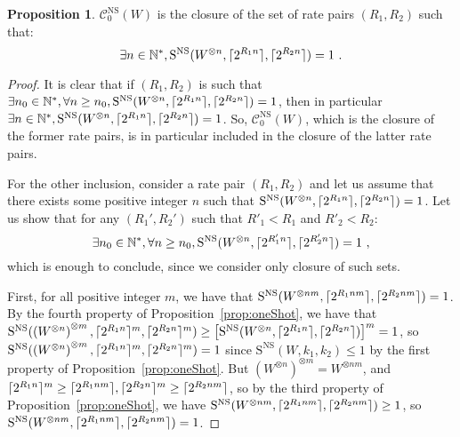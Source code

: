 \documentclass[11pt]{article}
\theoremstyle{definition}
\newtheorem{prop}[theo]{Proposition}
\theoremstyle{remark}
\DeclarePairedDelimiter\ceil{\lceil}{\rceil}
\begin{document}
\begin{prop}
  \label{prop:ZENScapacity}
   $\mathcal{C}^{\mathrm{NS}}_0(W)$ is the closure of the set of rate pairs $(R_1,R_2)$ such that:
  \[ \exists n \in \mathbb{N}^*, \mathrm{S}^{\mathrm{NS}}(W^{\otimes n},\ceil{2^{R_1n}},\ceil{2^{R_2n}}) = 1 \ . \]
\end{prop}
\begin{proof}
  It is clear that if $(R_1,R_2)$ is such that $\exists n_0 \in \mathbb{N}^*, \forall n \geq n_0, \mathrm{S}^{\mathrm{NS}}(W^{\otimes n},\ceil{2^{R_1n}},\ceil{2^{R_2n}}) = 1$, then in particular $\exists n \in \mathbb{N}^*, \mathrm{S}^{\mathrm{NS}}(W^{\otimes n},\ceil{2^{R_1n}},\ceil{2^{R_2n}}) = 1$. So, $\mathcal{C}^{\mathrm{NS}}_0(W)$, which is the closure of the former rate pairs, is in particular included in the closure of the latter rate pairs.
  
  For the other inclusion, consider a rate pair $(R_1,R_2)$ and let us assume that there exists some positive integer $n$ such that $\mathrm{S}^{\mathrm{NS}}(W^{\otimes n},\ceil{2^{R_1n}},\ceil{2^{R_2n}}) = 1$. Let us show that for any $(R_1',R_2')$ such that $R'_1 < R_1$ and $R'_2 < R_2$:
  \[ \exists n_0 \in \mathbb{N}^*, \forall n \geq n_0, \mathrm{S}^{\mathrm{NS}}(W^{\otimes n},\ceil{2^{R_1'n}},\ceil{2^{R_2'n}}) = 1 \ , \]
  which is enough to conclude, since we consider only closure of such sets.
  
  First, for all positive integer $m$, we have that $\mathrm{S}^{\mathrm{NS}}(W^{\otimes nm},\ceil{2^{R_1nm}},\ceil{2^{R_2nm}}) = 1$. By the fourth property of Proposition~\ref{prop:oneShot}, we have that $\mathrm{S}^{\mathrm{NS}}(\left(W^{\otimes n}\right)^{\otimes m},\ceil{2^{R_1n}}^m,\ceil{2^{R_2n}}^m) \geq \left[\mathrm{S}^{\mathrm{NS}}(W^{\otimes n},\ceil{2^{R_1n}},\ceil{2^{R_2n}})\right]^m = 1$, so $\mathrm{S}^{\mathrm{NS}}(\left(W^{\otimes n}\right)^{\otimes m},\ceil{2^{R_1n}}^m,\ceil{2^{R_2n}}^m) = 1$ since $\mathrm{S}^{\mathrm{NS}}(W,k_1,k_2) \leq 1$ by the first property of Proposition~\ref{prop:oneShot}. But $\left(W^{\otimes n}\right)^{\otimes m} = W^{\otimes nm}$, and $\ceil{2^{R_1n}}^m \geq \ceil{2^{R_1nm}},\ceil{2^{R_2n}}^m \geq \ceil{2^{R_2nm}}$, so by the third property of Proposition~\ref{prop:oneShot}, we have $\mathrm{S}^{\mathrm{NS}}(W^{\otimes nm},\ceil{2^{R_1nm}},\ceil{2^{R_2nm}}) \geq 1$, so $\mathrm{S}^{\mathrm{NS}}(W^{\otimes nm},\ceil{2^{R_1nm}},\ceil{2^{R_2nm}})=1$.


\end{proof}
\end{document}
